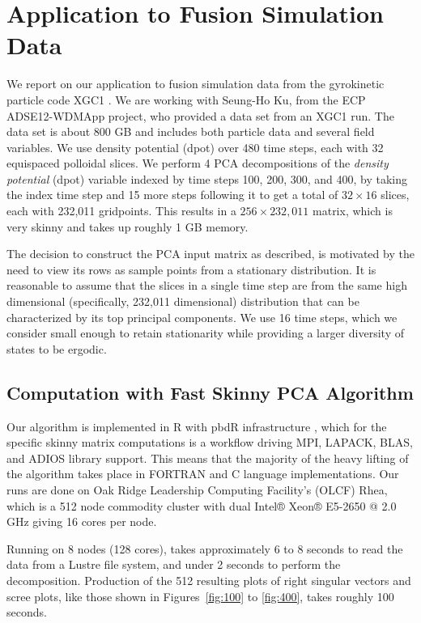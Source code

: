 \section{Application to Fusion Simulation Data}
\label{sec:xgc}
We report on our application to fusion simulation data from the
gyrokinetic particle code XGC1 \cite{Ku2009}. We are working with
Seung-Ho Ku, from the ECP ADSE12-WDMApp project, who provided a data
set from an XGC1 run. The data set is about 800 GB and includes both
particle data and several field variables. We use density potential
(dpot) over 480 time steps, each with 32 equispaced polloidal
slices. We perform 4 PCA decompositions of the {\it density potential}
(dpot) variable indexed by time steps 100, 200, 300, and 400, by
taking the index time step and 15 more steps following it to get a
total of $32\times 16$ slices, each with 232,011 gridpoints. This
results in a $256\times 232,011$ matrix, which is very skinny and
takes up roughly 1 GB memory.

The decision to construct the PCA input matrix as described, is
motivated by the need to view its rows as sample points from a
stationary distribution. It is reasonable to assume that the slices in
a single time step are from the same high dimensional (specifically,
232,011 dimensional) distribution that can be characterized by its top
principal components. We use 16 time steps, which we consider small
enough to retain stationarity while providing a larger diversity of
states to be ergodic.

\subsection{Computation with Fast Skinny PCA Algorithm}
Our algorithm is implemented in R with pbdR infrastructure
\cite{Schmidt2017}, which for the specific skinny matrix computations
is a workflow driving MPI, LAPACK, BLAS, and ADIOS library
support. This means that the majority of the heavy lifting of the
algorithm takes place in FORTRAN and C language implementations. Our
runs are done on Oak Ridge Leadership Computing Facility's (OLCF)
Rhea, which is a 512 node commodity cluster with dual Intel® Xeon®
E5-2650 @ 2.0 GHz giving 16 cores per node.

Running on 8 nodes (128 cores), takes
approximately 6 to 8 seconds to read the data from a Lustre file
system, and under 2 seconds to perform the decomposition. Production
of the 512 resulting plots of right singular vectors and scree plots, like
those shown in Figures~\ref{fig:100} to \ref{fig:400}, takes roughly
100 seconds.

